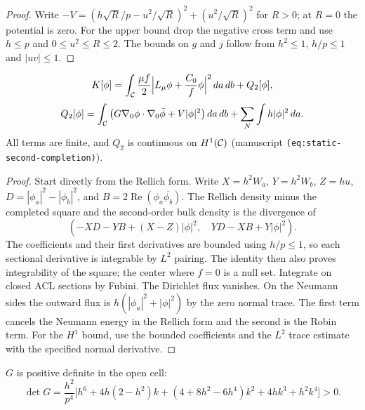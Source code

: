 \begin{proof}
\leanok
Write $-V=(h\sqrt R/p-u^2/\sqrt R)^2+(u^2/\sqrt R)^2$ for $R>0$;
at $R=0$ the potential is zero. For the upper bound drop the negative
cross term and use $h\le p$ and $0\le u^2\le R\le2$. The bounds on $g$
and $j$ follow from $h^2\le1$, $h/p\le1$ and $|uv|\le1$.
\end{proof}

\begin{lemma}
\label{lem:mixed-completion}
\leanok
\[
  K[\phi]=\int_{\mathcal{C}}\frac{\mu f}2\Big|L_\mu\phi+\frac{C_0}f\phi\Big|^2\,da\,db+Q_2[\phi],
\]
\[
  Q_2[\phi]=\int_{\mathcal{C}}\big(G\nabla_0\phi\cdot\nabla_0\bar\phi+V|\phi|^2\big)\,da\,db
  +\sum_N\int h|\phi|^2\,da .
\]
All terms are finite, and $Q_2$ is continuous on $H^1(\mathcal{C})$ (manuscript
\texttt{(eq:static-second-completion)}).
\end{lemma}

\begin{proof}
\leanok
Start directly from the Rellich form. Write $X=h^2W_a$, $Y=h^2W_b$,
$Z=hu$, $D=|\phi_a|^2-|\phi_b|^2$, and
$B=2\operatorname{Re}(\phi_a\overline{\phi_b})$. The Rellich density
minus the completed square and the second-order bulk density is the
divergence of
\[
  (-XD-YB+(X-Z)|\phi|^2,\quad YD-XB+Y|\phi|^2).
\]
The coefficients and their first derivatives are bounded using $h/p\le1$,
so each sectional derivative is integrable by $L^2$ pairing.
The identity then also proves integrability of the square; the center
where $f=0$ is a null set. Integrate on closed ACL sections by Fubini.
The Dirichlet flux vanishes. On the Neumann sides the outward flux is
$h(|\phi_a|^2+|\phi|^2)$ by the zero normal trace. The first term cancels
the Neumann energy in the Rellich form and the second is the Robin term.
For the $H^1$ bound, use the bounded coefficients and the $L^2$ trace
estimate with the specified normal derivative.
\end{proof}

\begin{lemma}
\label{lem:mixed-G-positive}
\leanok
$G$ is positive definite in the open cell:
\[
  \det G=\frac{h^2}{p^4}\big[h^6+4h(2-h^2)k+(4+8h^2-6h^4)k^2+4hk^3+h^2k^4\big]>0 .
\]
\end{lemma}

